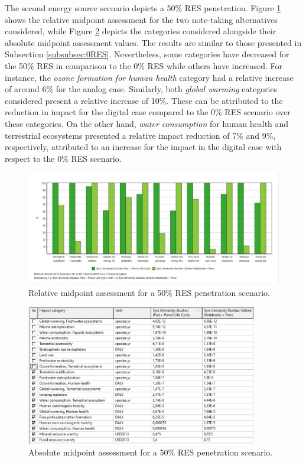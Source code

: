The second energy source scenario depicts a 50\% RES penetration. Figure \ref*{fig:characterization_RES_50} shows the relative midpoint assessment for the two note-taking alternatives considered, while Figure \ref{fig:characterization_table_RES_50} depicts the categories considered alongside their absolute midpoint assessment values. The results are similar to those presented in Subsection \ref{subsubsec:0RES}. Nevertheless, some categories have decreased for the 50\% RES in comparison to the 0\% RES while others have increased. For instance, the \textit{ozone formation for human health} category had a relative increase of around 6\% for the analog case. Similarly, both \textit{global warming} categories considered present a relative increase of 10\%. These can be attributed to the reduction in impact for the digital case compared to the 0\% RES scenario over these categories. On the other hand, \textit{water consumption} for human health and terrestrial ecosystems presented a relative impact reduction of 7\% and 9\%, respectively, attributed to an increase for the impact in the digital case with respect to the 0\% RES scenario. 

\begin{figure}[H]
    \centering
    \includegraphics[width=\textwidth]{images/RES_50/Characterization_RES_50.JPG}
    \caption{Relative midpoint assessment for a 50\% RES penetration scenario.}\label{fig:characterization_RES_50}
\end{figure}

\begin{figure}[H]
    \centering
    \includegraphics[width=0.9\textwidth]{images/RES_50/Characterization_Table_RES_50.PNG}
    \caption{Absolute midpoint assessment for a 50\% RES penetration scenario.}\label{fig:characterization_table_RES_50}
\end{figure}

